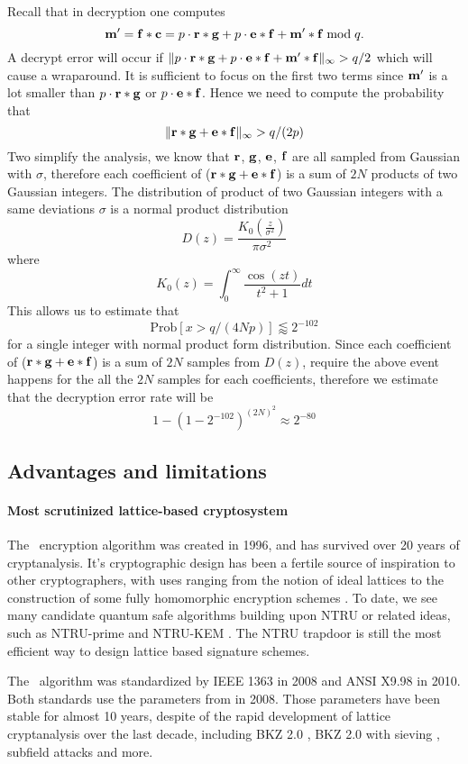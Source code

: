 \documentclass{llncs}
\newcommand{\bfc}{{\bf c}}
\newcommand{\bfe}{{\bf e}}
\newcommand{\bff}{{\bf f}}
\newcommand{\bfg}{{\bf g}}
\newcommand{\bfm}{{\bf m}}
\newcommand{\bfr}{{\bf r}}
\newcommand{\ntru}{{\sf{NTRU}}}
\newcommand{\<}{\langle}
\renewcommand{\>}{\rangle}
\begin{document}
Recall that in decryption one computes
$$\bfm' = \bff * \bfc = p \cdot \bfr * \bfg +  p\cdot
\bfe *\bff + \bfm'*\bff \bmod q.$$
A decrypt error will occur if $\|p \cdot \bfr * \bfg +  p\cdot
\bfe *\bff + \bfm'*\bff\|_\infty >q/2$ which will 
cause a wraparound. It is sufficient to focus on the first two terms since $\bfm'$ is a lot smaller than $p\cdot\bfr*\bfg$ or $p\cdot\bfe*\bff$. Hence we need to compute the
probability that 
$$\|\bfr*\bfg + \bfe*\bff\|_\infty > q/(2p) $$
Two simplify the analysis, we know that $\bfr$, $\bfg$, $\bfe$, $\bff$ are all sampled from Gaussian with $\sigma$, therefore each coefficient of ($\bfr*\bfg + \bfe*\bff$)
is a sum of $2N$ products of two Gaussian integers.
The distribution of product of two Gaussian integers with a 
same deviations $\sigma$  is a 
normal product distribution
$$
D(z) = \frac{K_0(\frac{z}{\sigma^2})}{\pi\sigma^2}
$$
where $$K_0(z) = \int_0^\infty \frac{\cos{(zt)}}{t^2+1}dt$$
This allows us to estimate that 
$$\text{Prob}[x>q/(4Np)] \lessapprox 2^{-102}$$
for a single integer with normal product form distribution.
Since each coefficient of ($\bfr*\bfg + \bfe*\bff$) is
a sum of $2N$ samples from $ D(z)$, require the above 
event happens for the all the $2N$ samples for each coefficients, therefore we estimate that the 
decryption error rate will be
$$1-(1-2^{-102})^{(2N)^2} \approx 2^{-80}$$



\subsection{Advantages and limitations}
\paragraph{Most scrutinized lattice-based cryptosystem}
The \ntru~encryption algorithm was created in 1996, and has survived over 20 years
of cryptanalysis. 
It's cryptographic design has been a fertile source of inspiration to other cryptographers, with uses ranging from the notion of ideal lattices 
\cite{DBLP:journals/cc/Micciancio07} to
the construction of some fully homomorphic encryption schemes \cite{DBLP:conf/stoc/Gentry09,ltv13}.
To date, we see many candidate quantum safe algorithms building upon NTRU or
related ideas, such as NTRU-prime \cite{DBLP:journals/iacr/BernsteinCLV16} and
NTRU-KEM \cite{DBLP:conf/ches/HulsingRSS17}. The NTRU trapdoor is still the most efficient way to design lattice based signature schemes.


The \ntru~algorithm was standardized by IEEE 1363 \cite{ieee1363_1} in 2008 and ANSI X9.98 \cite{x998} in 2010. Both standards use the parameters from \cite{params08} in 2008. Those
parameters have been stable for almost 10 years, despite of the rapid
development of lattice cryptanalysis over the last decade, including
BKZ 2.0 \cite{BKZ2}, BKZ 2.0 with sieving \cite{newhope}, subfield
attacks \cite{subfielddjb,subfieldabd,subfieldcjl,subfieldkf} and more. 
\end{document}
